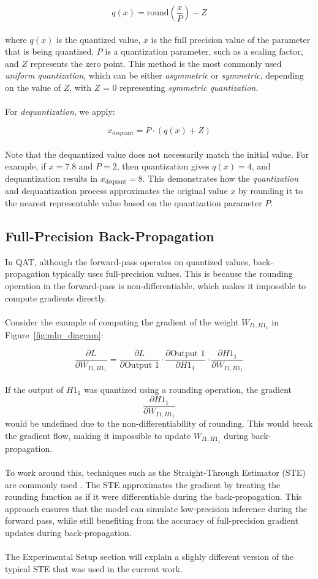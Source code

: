 \[
q(x) = \text{round}\left( \frac{x}{P} \right) - Z
\]
\\
\noindent where \( q(x) \) is the quantized value, \( x \) is the full precision value of the parameter that is being quantized, \( P \) is a quantization parameter, such as a scaling factor, 
and \( Z \) represents the zero point. This method is the most commonly used \textit{uniform quantization}, which can be either \textit{asymmetric} or \textit{symmetric}, 
depending on the value of \( Z \), with  \( Z \) = 0 representing \textit{symmetric quantization}.
\\
\\
For \textit{dequantization}, we apply:

\[
x_{\text{dequant}} = P \cdot ( q(x) + Z)
\]
\\
\noindent Note that the dequantized value does not necessarily match the initial value. 
For example, if \( x = 7.8 \) and \( P = 2 \), then quantization gives \( q(x) = 4 \), and dequantization results in \( x_{\text{dequant}} = 8 \). 
This demonstrates how the \textit{quantization} and dequantization process approximates the original value \( x \)
by rounding it to the nearest representable value based on the quantization parameter \( P \).

\subsection{Full-Precision Back-Propagation}
\label{subsec:subsection1}
In QAT, although the forward-pass operates on quantized values, back-propagation typically uses full-precision values. 
This is because the rounding operation in the forward-pass is non-differentiable, which makes it impossible to compute gradients directly.
\\
\\
Consider the example of computing the gradient of the weight \( W_{I1,H1_1} \) in Figure~\ref{fig:mlp_diagram}:

\[
\frac{\partial L}{\partial W_{I1,H1_1}} = \frac{\partial L}{\partial \text{Output 1}} \cdot \frac{\partial \text{Output 1}}{\partial H1_1} \cdot \frac{\partial H1_1}{\partial W_{I1,H1_1}}
\]
\\
\noindent If the output of \( H1_1 \) was quantized using a rounding operation, the gradient 
\[
\frac{\partial H1_1}{\partial W_{I1,H1_1}} 
\]
would be undefined due to the non-differentiability of rounding. This would break the gradient flow, making it impossible to update  \( W_{I1,H1_1} \)
during back-propagation.
\\
\\
To work around this, techniques such as the Straight-Through Estimator (STE) are commonly used \cite{bengio2013estimating} \cite{fan2021training} \cite{zhuang2018towards}.
The STE approximates the gradient by treating the rounding function as if it were differentiable during the back-propagation.
This approach ensures that the model can simulate low-precision inference during the forward pass,
while still benefiting from the accuracy of full-precision gradient updates during back-propagation.
\\
\\
The Experimental Setup section will explain a slighly different version of the typical STE that was used in the current work.